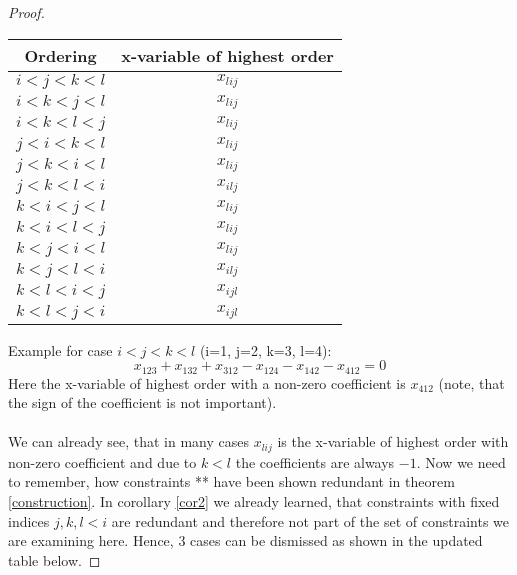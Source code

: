 \documentclass{scrartcl}
\theoremstyle{plain}
\begin{document}
\begin{proof}
	
	\begin{center}
		\begin{tabular}{||c | c ||} 
			\hline
			Ordering & x-variable of highest order \\ [0.5ex] 
			\hline\hline
			$i<j<k<l$ & $x_{lij}$ \\ 
			\hline
			$i<k<j<l$ & $x_{lij}$ \\ 
			\hline
			$i<k<l<j$ & $x_{lij}$ \\ 
			\hline
			$j<i<k<l$ & $x_{lij}$ \\ 
			\hline
			$j<k<i<l$ & $x_{lij}$ \\ 
			\hline
			$j<k<l<i$ & $x_{ilj}$ \\ 
			\hline
			$k<i<j<l$ & $x_{lij}$ \\ 
			\hline
			$k<i<l<j$ & $x_{lij}$ \\ 
			\hline
			$k<j<i<l$ & $x_{lij}$ \\ 
			\hline
			$k<j<l<i$ & $x_{ilj}$ \\ 
			\hline
			$k<l<i<j$ & $x_{ijl}$ \\ 
			\hline
			$k<l<j<i$ & $x_{ijl}$ \\ 
			\hline
		\end{tabular}
	\end{center}
	Example for case $i<j<k<l$ (i=1, j=2, k=3, l=4):
	\begin{equation*}
	x_{123} + x_{132} + x_{312} - x_{124} - x_{142} - x_{412} = 0
	\end{equation*}
	Here the x-variable of highest order with a non-zero coefficient is $x_{412}$ (note, that the sign of the coefficient is not important). \\
	\\
We can already see, that in many cases $x_{lij}$ is the x-variable of highest order with non-zero coefficient and due to $k<l$ the coefficients are always $-1$. Now we need to remember, how constraints ** have been shown redundant in theorem \ref{construction}. In corollary \ref{cor2} we already learned, that constraints with fixed indices $j,k,l<i$ are redundant and therefore not part of the set of constraints we are examining here. Hence, 3 cases can be dismissed as shown in the updated table below. 
	

\end{proof}
\end{document}
